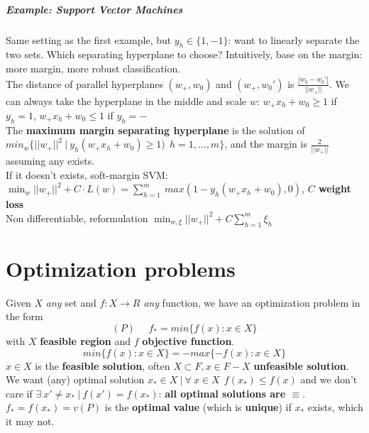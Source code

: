 \documentclass[10pt]{report}
\begin{document}
\subparagraph{Example: Support Vector Machines} Same setting as the first example, but $y_h\in\{1,-1\}$: want to linearly separate the two sets. Which separating hyperplane to choose? Intuitively, base on the margin: more margin, more robust classification.\\
The distance of parallel hyperplanes $(w_+, w_0)$ and $(w_+, w_0')$ is $\frac{|w_0 - w_0'|}{||w_+||}$. We can always take the hyperplane in the middle and scale $w$: $w_+x_h + w_0 \geq 1$ if $y_h = 1$, $w_+x_h + w_0 \leq 1$ if $y_h = -$\\
The \textbf{maximum margin separating hyperplane} is the solution of $min_w\{||w_+||^2\:|\:y_h(w_+x_h + w_0)\geq 1)\:\:h=1,\ldots,m\}$, and the margin is $\frac{2}{||w_+||}$ assuming any exists.\\
If it doesn't exists, soft-margin SVM: $\min_w ||w_+||^2 + C\cdot L(w) = \sum_{h=1}^m\:max(1-y_h(w_+x_h + w_0), 0)$, \textbf{$C$ weight loss}\\
Non differentiable, reformulation $\min_{w,\xi} ||w_+||^2 + C\sum_{h=1}^m \xi_h$
\pagebreak
\section{Optimization problems}
Given $X$ \textit{any} set and $f:X\rightarrow R$ \textit{any} function, we have an optimization problem in the form $$(P)\:\:\:\:\:\:f_*=min\{f(x) : x\in X\}$$
with $X$ \textbf{feasible region} and $f$ \textbf{objective function}.
$$min\{f(x) : x\in X\} = -max\{-f(x) : x\in X\}$$
$x\in X$ is the \textbf{feasible solution}, often $X\subset F, x\in F-X$ \textbf{unfeasible solution}. We want (any) optimal solution $x_* \in X\:|\:\forall\:x\in X\:\:f(x_*)\leq f(x)$ and we don't care if $\exists\:x'\neq x_*\:|\:f(x')=f(x_*)$: \textbf{all optimal solutions are $\equiv$}. $f_* = f(x_*) = v(P)$ is the \textbf{optimal value} (which is \textbf{unique}) if $x_*$ exists, which it may not.
\end{document}
